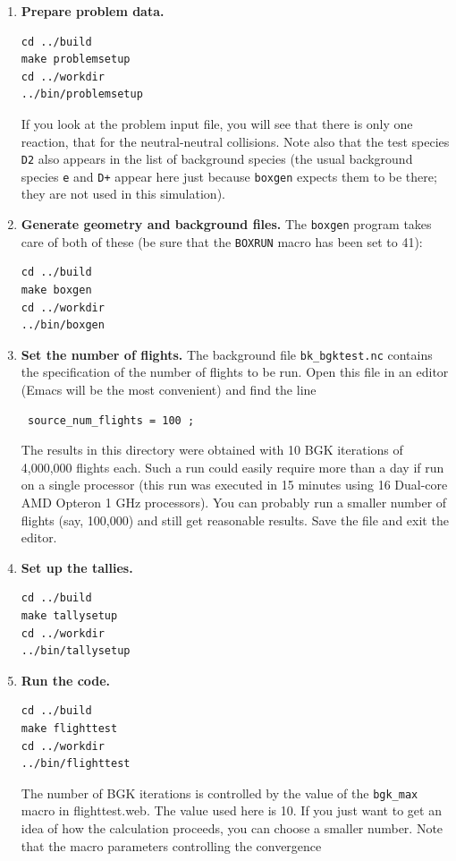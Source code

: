 \documentclass[12pt]{report}
\begin{document}
\begin{enumerate}
\begin{verbatim}
make datasetup
cd ../workdir
../bin/datasetup
\end{verbatim}
  \item {\bf Prepare problem data.}
\begin{verbatim}
cd ../build
make problemsetup
cd ../workdir
../bin/problemsetup
\end{verbatim}
If you look at the problem input file, you will see that there is only
one reaction, that for the neutral-neutral collisions. Note also that
the test species \verb+D2+ also appears in the list of background species
(the usual background species \verb+e+ and \verb-D+- appear here just because
{\tt boxgen} expects them to be there; they are not used in this simulation).
  \item {\bf Generate geometry and background files.} The {\tt boxgen}
program takes care of both of these (be sure that the \verb+BOXRUN+ macro
has been set to 41):
\begin{verbatim}
cd ../build
make boxgen
cd ../workdir
../bin/boxgen
\end{verbatim}
  \item {\bf Set the number of flights.} The background file {\tt bk\_bgktest.nc}
contains the specification of the number of flights to be run. Open this
file in an editor (Emacs will be the most convenient) and find the line
\begin{verbatim}
 source_num_flights = 100 ;
\end{verbatim}
The results in this directory were obtained with 10 BGK iterations of
4,000,000 flights each. Such a run could easily require
more than a day if run on a single processor (this run was executed
in 15 minutes using 16 Dual-core AMD Opteron 1 GHz processors).
You can probably run a smaller
number of flights (say, 100,000) and still get reasonable results.
Save the file and exit the editor.
  \item {\bf Set up the tallies.} 
\begin{verbatim}
cd ../build
make tallysetup
cd ../workdir
../bin/tallysetup
\end{verbatim}
  \item {\bf Run the code.}
\begin{verbatim}
cd ../build
make flighttest
cd ../workdir
../bin/flighttest
\end{verbatim}
The number of BGK iterations is controlled by the value of the 
\verb+bgk_max+ macro in flighttest.web. The value used here is 10. If you just
want to get an idea of how the calculation proceeds, you can choose a
smaller number. Note that the macro parameters controlling the convergence

\end{enumerate}
\end{document}

